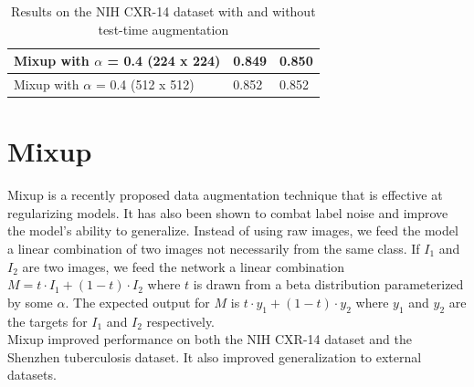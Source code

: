 \documentclass[12pt,oneside,a4paper]{report}
\begin{document}
\begin{table}[]
\begin{tabular}{@{}lll@{}}
    Mixup with $\alpha$ = 0.4 (224 x 224)                                                                  & 0.849                & \textbf{0.850}      \\ \midrule
    Mixup with $\alpha$ = 0.4 (512 x 512)                                                                  & 0.852                & 0.852               \\ \bottomrule
  \end{tabular}
  \caption{Results on the NIH CXR-14 dataset with and without test-time
    augmentation}
  \label{tab:tta}
\end{table}

\section{Mixup}
Mixup is a recently proposed data augmentation technique \cite{Zhang2017} that
is effective at regularizing models. It has also been shown to combat label
noise and improve the model's ability to generalize. Instead of using raw
images, we feed the model a linear combination of two images not necessarily
from the same class. If $I_1$ and $I_2$ are two images, we feed the network a
linear combination $M = t \cdot{}I_1 + (1 - t) \cdot{}I_2$ where $t$ is drawn
from a beta distribution parameterized by some $\alpha$. The expected output for
$M$ is $ t \cdot{} y_1 + (1 - t) \cdot{} y_2$ where $y_1$ and $y_2$ are the
targets for $I_1$
and $I_2$ respectively.\\

Mixup improved performance on both the NIH CXR-14 dataset and the Shenzhen
tuberculosis dataset. It also improved generalization to external datasets.
\end{document}
